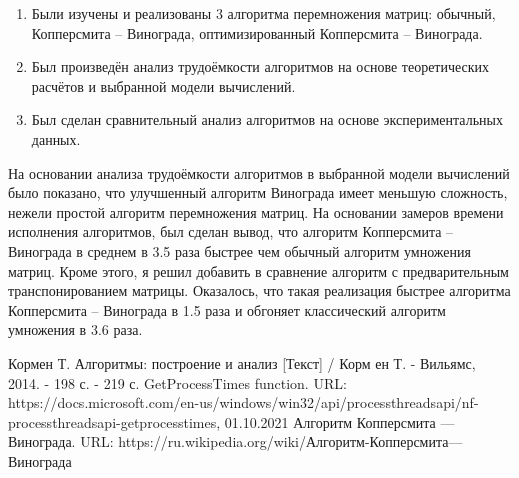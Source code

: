 \documentclass[12pt]{report}
\begin{document}
\begin{enumerate}
	\item Были изучены и реализованы 3 алгоритма перемножения матриц: обычный, Копперсмита -- Винограда, оптимизированный Копперсмита -- Винограда.
	\item Был произведён анализ трудоёмкости алгоритмов на основе теоретических расчётов и выбранной модели вычислений.
	\item Был сделан сравнительный анализ алгоритмов на основе экспериментальных данных.
\end{enumerate}

На основании анализа трудоёмкости алгоритмов в выбранной модели вычислений было показано, что улучшенный алгоритм Винограда имеет меньшую сложность, нежели простой алгоритм перемножения матриц. На основании замеров времени исполнения алгоритмов, был сделан вывод, что алгоритм Копперсмита -- Винограда в среднем в 3.5 раза быстрее чем обычный алгоритм умножения матриц. Кроме этого, я решил добавить в сравнение алгоритм с предварительным транспонированием матрицы. Оказалось, что такая реализация быстрее алгоритма Копперсмита -- Винограда в 1.5 раза и обгоняет классический алгоритм умножения в 3.6 раза. 

\newpage
{}
\begin{thebibliography}{}
Кормен Т. Алгоритмы: построение и анализ [Текст] / Корм ен Т. - Вильямс, 2014. - 198 с. - 219 с.
GetProcessTimes function. URL: https://docs.microsoft.com/en-us/windows/win32/api/processthreadsapi/nf-processthreadsapi-getprocesstimes, 01.10.2021
Алгоритм Копперсмита — Винограда. URL: https://ru.wikipedia.org/wiki/Алгоритм-Копперсмита—Винограда
\end{thebibliography}
	

\end{document}
